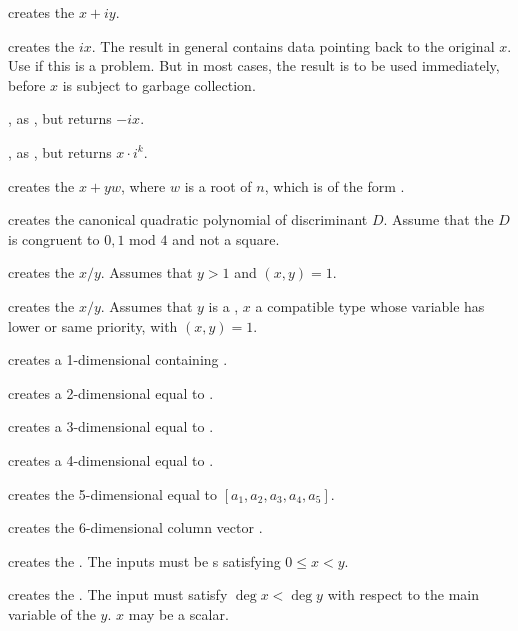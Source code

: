  creates the  $x + iy$.

 creates the  $ix$. The result in
general contains data pointing back to the original $x$. Use  if
this is a problem. But in most cases, the result is to be used immediately,
before $x$ is subject to garbage collection.

, as , but returns $-ix$.

, as , but returns
$x \cdot i^k$.

 creates the  $x + yw$,
where $w$ is a root of $n$, which is of the form .

 creates the canonical quadratic polynomial of
discriminant $D$. Assume that the  $D$ is congruent to $0,1$ mod $4$
and not a square.

 creates the  $x/y$. Assumes that
$y > 1$ and $(x,y) = 1$.

 creates the  $x/y$. Assumes
that $y$ is a , $x$ a compatible type whose variable has lower
or same priority, with $(x,y) = 1$.

 creates a 1-dimensional  containing .

 creates a 2-dimensional  equal to
\kbd{[x,y]}.

 creates a 3-dimensional 
equal to \kbd{[x,y,z]}.

 creates a 4-dimensional 
equal to \kbd{[x,y,z,t]}.

 creates the
5-dimensional  equal to $[a_1,a_2,a_3,a_4,a_5]$.

creates the $6$-dimensional column vector \kbd{[x,y,z,t,u,v]~}.

 creates the  .
The inputs must be s satisfying $0 \leq x < y$.

 creates the  .
The input must satisfy $\deg x < \deg y$ with respect to the main variable of
the  $y$. $x$ may be a scalar.

